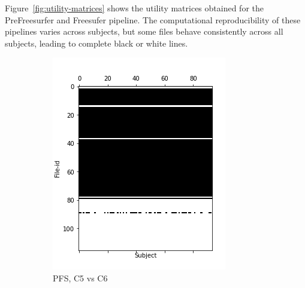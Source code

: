 \documentclass[10pt, conference, compsocconf]{IEEEtran}
\begin{document}
Figure~\ref{fig:utility-matrices} shows the utility matrices
obtained for the PreFreesurfer and Freesufer pipeline. The computational
reproducibility of these pipelines varies across subjects,
but some files behave
consistently across all subjects, leading to complete black or white
lines.

\begin{figure}[h!]
  \centering
  \begin{subfigure}[b]{0.45\columnwidth}
        \includegraphics[width=\columnwidth]{data/Utility_Matrix/PreFreeSurfer/PFS_5v6_utility_matrix.png}
  \caption{PFS, C5 vs C6}
  \end{subfigure}
  \begin{subfigure}[b]{0.45\columnwidth}

\end{subfigure}
\end{figure}
\end{document}
